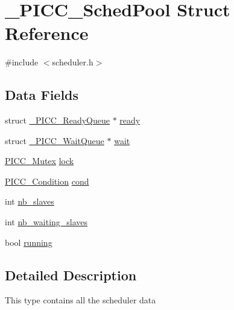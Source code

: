 \hypertarget{struct__PICC__SchedPool}{\section{\-\_\-\-P\-I\-C\-C\-\_\-\-Sched\-Pool Struct Reference}
\label{struct__PICC__SchedPool}
}


{\ttfamily \#include $<$scheduler.\-h$>$}

\subsection*{Data Fields}
{\bf }\par
\begin{DoxyCompactItemize}
\item 
struct \hyperlink{struct__PICC__ReadyQueue}{\-\_\-\-P\-I\-C\-C\-\_\-\-Ready\-Queue} $\ast$ \hyperlink{struct__PICC__SchedPool_ac631e8875659f9413be6c744a4612c3a}{ready}
\item 
struct \hyperlink{struct__PICC__WaitQueue}{\-\_\-\-P\-I\-C\-C\-\_\-\-Wait\-Queue} $\ast$ \hyperlink{struct__PICC__SchedPool_aecc100746299a575ead9e5e43bede174}{wait}
\item 
\hyperlink{sync_8h_a600a20a1dd394c06182a81d72e3357f4}{P\-I\-C\-C\-\_\-\-Mutex} \hyperlink{struct__PICC__SchedPool_ab322b207c03204dfc4b2afd5a19e32cf}{lock}
\item 
\hyperlink{sync_8h_af4e0a3af8bd3e7ee2a2281fc6817b32d}{P\-I\-C\-C\-\_\-\-Condition} \hyperlink{struct__PICC__SchedPool_ad146af14a9d5b8c490ae0a5579d59da1}{cond}
\item 
int \hyperlink{struct__PICC__SchedPool_a911d4f57e6a2cefd736d4cfd3a94b435}{nb\-\_\-slaves}
\item 
int \hyperlink{struct__PICC__SchedPool_ae78e0ed1fcc5953008c184b02840f3b7}{nb\-\_\-waiting\-\_\-slaves}
\item 
bool \hyperlink{struct__PICC__SchedPool_ae86d4523d59cb922e141d536d7f9efd5}{running}
\end{DoxyCompactItemize}



\subsection{Detailed Description}
This type contains all the scheduler data 

